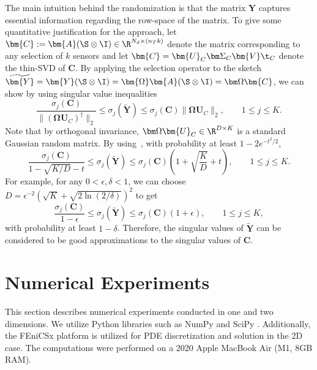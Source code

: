 \documentclass{aims} %
\theoremstyle{definition}
\begin{document}
The main intuition behind the randomization is that the matrix $\bm{Y}$ captures essential information regarding the row-space of the matrix. To give some quantitative justification for the approach, let $\bm{C} := \bm{A}(\S \otimes \I) \in \R^{N_d\times (n_Tk)}$ denote the matrix corresponding to any selection of $k$ sensors and let $\bm{C} =\bm{U}_C\bm\Sigma_C\bm{V}\t_C$ denote the thin-SVD of $\bm{C}$. 
By applying the selection operator to the sketch $\widetilde{\bm{Y}} = \bm{Y}(\S \otimes \I) = \bm{\Omega}\bm{A}(\S \otimes \I) = \bm\Omega\bm{C} $, we can show by using singular value inequalities  
\[   \frac{\sigma_j(\bm{C})}{ \| (\bm\Omega \bm{U}_C)^\dagger\|_2}\le \sigma_j(\widetilde{\bm{Y}}) \le \sigma_j(\bm{C}) \| \bm\Omega \bm{U}_C\|_2, \qquad 1 \le j \le K.\]
Note that by orthogonal invariance, $\bm\Omega \bm{U}_C \in \R^{D\times K}$ is a standard Gaussian random matrix. By using~\cite[Section 7.3]{vershynin2018high}, with probability at least $1-2e^{-t^2/2}$,  
\[ \frac{\sigma_j(\bm{C})}{1 - \sqrt{K/D} -t }\le \sigma_j(\widetilde{\bm{Y}}) \le \sigma_j(\bm{C}) \left( 1 + \sqrt{\frac{K}{D}}  + t\right), \qquad 1 \le j \le K .\]
For example, for any $ 0 < \epsilon, \delta < 1$,  we can choose $D =\epsilon^{-2}(\sqrt{K}+ \sqrt{2\ln(2/\delta)})^2$ to get
\[  \frac{\sigma_j(\bm{C})}{1 - \epsilon }\le \sigma_j(\widetilde{\bm{Y}}) \le \sigma_j(\bm{C}) \left( 1 + \epsilon\right), \qquad 1 \le j \le K ,\]
with probability at least $1-\delta$. Therefore, the singular values of $\widetilde{\bm{Y}}$ can be considered to be good approximations to the singular values of $\bm{C}$. 



\section{Numerical Experiments}\label{sec:Numerical_experiments}
%
This section describes numerical experiments conducted in one and two dimensions.
We utilize Python libraries such as NumPy  \cite{NumPy} and SciPy \cite{2020SciPy-NMeth}.
Additionally, the FEniCSx platform   \cite{FEniCSX}  is utilized for PDE discretization and solution in the 2D case. 
The computations were performed on a 
2020 Apple MacBook Air (M1, 8GB RAM).
%
\end{document}
